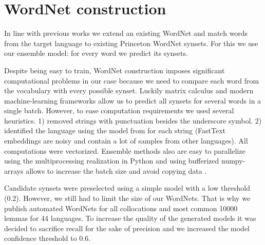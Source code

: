 \documentclass[conference]{IEEEtran}
\newcommand{\LanguagesN}{44 }
\begin{document}
	
	\section{WordNet construction}
	In line with previous works \cite{Vossen1998,tufis2006romanian} we extend an existing WordNet and match words from the target language to existing Princeton WordNet synsets. For this we use our ensemble model: for every word we predict its synsets.
	
	Despite being easy to train, WordNet construction imposes significant computational problems in our case because we need to compare each word from the vocabulary with every possible synset. Luckily matrix calculus and modern machine-learning frameworks allow us to predict all synsets for several words in a single batch. However, to ease computation requirements we used several heuristics. 1) removed strings with punctuation besides the underscore symbol. 2) identified the language using the model from \cite{Joulin2016} for each string (FastText embeddings are noisy and contain a lot of samples from other languages).  All computations were vectorized. Ensemble methods also are easy to parallelize using the multiprocessing realization in Python and using bufferized numpy-arrays allows to increase the batch size and avoid copying data \cite{gorelick2014high}.
	
	Candidate synsets were preselected using a simple model with a low threshold (0.2). However, we still had to limit the size of our WordNets. That is why we publish automated WordNets for all collocations and most common 10000 lemmas for \LanguagesN languages. To increase the quality of the generated models it was decided to sacrifice recall for the sake of precision and we increased the model confidence threshold to 0.6.
	
\end{document}
